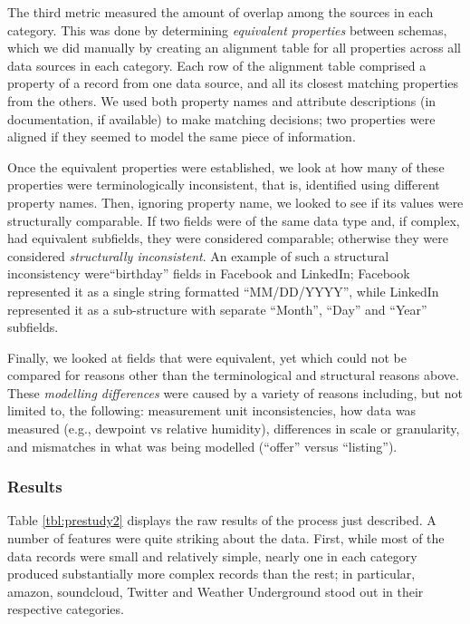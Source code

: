 \documentclass{sigchi}
\begin{document}
The third metric measured the amount of overlap among the sources in each category.  This was done by determining \emph{equivalent properties} between schemas, which we did manually by creating an alignment table for all properties across all data sources in each category.  Each row of the alignment table comprised a property of a record from one data source, and all its closest matching properties from the others.  We used both property names and attribute descriptions (in documentation, if available) to make matching decisions; two properties were aligned if they seemed to model the same piece of information.

Once the equivalent properties were established, we look at how many of these properties were terminologically inconsistent, that is, identified using different property names.   Then, ignoring property name, we looked to see if its values were structurally comparable.  If two fields were of the same data type and, if complex, had equivalent subfields, they were considered comparable; otherwise they were considered \emph{structurally inconsistent}.  An example of such a structural inconsistency were``birthday'' fields in Facebook and LinkedIn; Facebook represented it as a single string formatted ``MM/DD/YYYY'', while LinkedIn represented it as a sub-structure with separate ``Month'', ``Day'' and ``Year'' subfields.  

Finally, we looked at fields that were equivalent, yet which could not be compared for reasons other than the terminological and structural reasons above.  These \emph{modelling differences} were caused by a variety of reasons including, but not limited to, the following: measurement unit inconsistencies, how data was measured (e.g., dewpoint vs relative humidity), differences in scale or granularity, and mismatches in what was being modelled (``offer'' versus ``listing'').

\subsubsection{Results}
Table \ref{tbl:prestudy2} displays the raw results of the process just described.  A number of features were quite striking about the data. First, while most of the data records were small and relatively simple, nearly one in each category produced substantially more complex records than the rest; in particular, amazon, soundcloud, Twitter and Weather Underground stood out in their respective categories. 
\end{document}
